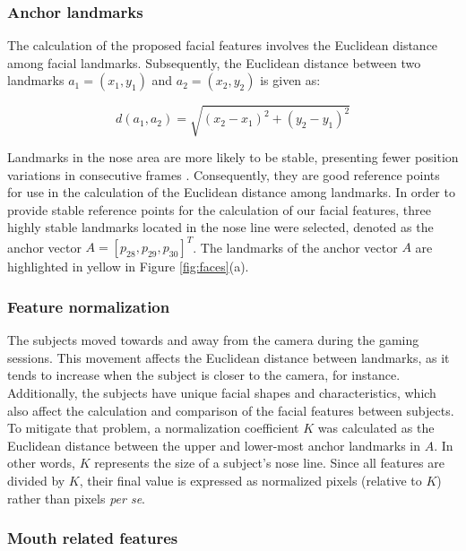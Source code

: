 \subsubsection{Anchor landmarks}

The calculation of the proposed facial features involves the Euclidean distance among facial landmarks. Subsequently, the Euclidean distance between two landmarks $a_1 = (x_1, y_1)$ and $a_2 = (x_2, y_2)$ is given as:

\[
d(a_1,a_2) = \sqrt{(x_2 - x_1)^2 + (y_2 - y_1)^2}
\]

Landmarks in the nose area are more likely to be stable, presenting fewer position variations in consecutive frames \parencite{giannakakis2017stress}. Consequently, they are good reference points for use in the calculation of the Euclidean distance among landmarks. In order to provide stable reference points for the calculation of our facial features, three highly stable landmarks located in the nose line were selected, denoted as the anchor vector $A = [p_{28}, p_{29}, p_{30}]^T$. The landmarks of the anchor vector $A$ are highlighted in yellow in Figure \ref{fig:faces}(a).

\subsubsection{Feature normalization}

The subjects moved towards and away from the camera during the gaming sessions. This movement affects the Euclidean distance between landmarks, as it tends to increase when the subject is closer to the camera, for instance. Additionally, the subjects have unique facial shapes and characteristics, which also affect the calculation and comparison of the facial features between subjects. To mitigate that problem, a normalization coefficient $K$ was calculated as the Euclidean distance between the upper and lower-most anchor landmarks in $A$. In other words, $K$ represents the size of a subject's nose line. Since all features are divided by $K$, their final value is expressed as normalized pixels (relative to $K$) rather than pixels \textit{per se}.

\subsubsection{Mouth related features}


